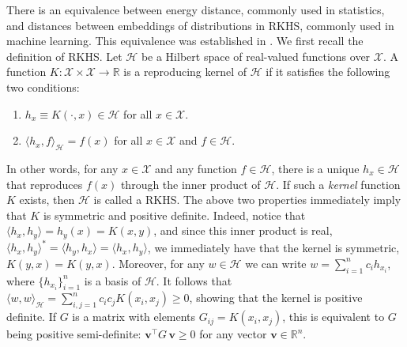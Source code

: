 \documentclass[aps,preprint,nofootinbib,floatfix]{revtex4-1}
\newcommand\kk{K}
\newcommand\kkk{h}
\newcommand\HH{\mathcal{H}}
\begin{document}
There is an equivalence between energy distance, 
commonly used in statistics,
and distances between embeddings of distributions in 
RKHS, commonly used in machine learning. 
This equivalence was established
in \cite{Sejdinovic2013}. We first recall the definition of
RKHS. Let $\HH$ be a Hilbert space of real-valued functions
over $\mathcal{X}$. A function 
$\kk : \mathcal{X} \times \mathcal{X} \to 
\mathbb{R}$ is a reproducing kernel of $\HH$ if it satisfies
the following two conditions:
\begin{enumerate}
\item $\kkk_x \equiv \kk(\cdot, x) \in \HH$ 
for all $x \in \mathcal{X}$.
\item $\langle \kkk_x, f \rangle_{\HH} = f(x)$ for
all $x\in\mathcal{X}$ and $f\in \HH$.
\end{enumerate}
In other words, for any $x \in \mathcal{X}$ and any function $f \in \HH$,
there is a unique 
$\kkk_x \in \HH$ that reproduces $f(x)$ through the inner product
of $\HH$.
If such a \emph{kernel} 
function $\kk$ exists, then $\HH$ is called a RKHS. The above two 
properties immediately imply that $\kk$ is symmetric and positive
definite. Indeed, notice that
$\langle \kkk_x, \kkk_y \rangle = \kkk_y(x) = \kk(x,y)$, and since
this inner product is real,
$\langle \kkk_x, \kkk_y \rangle^* = \langle \kkk_y, \kkk_x \rangle = 
\langle \kkk_x, \kkk_y \rangle$, we immediately have that
the kernel is symmetric,
$\kk(y,x) = \kk(y,x)$. Moreover, for any $w \in
\HH$ we can write $w = \sum_{i=1}^n c_i \kkk_{x_i}$, where
$\{ \kkk_{x_i} \}_{i=1}^n$ is a basis of $\HH$. It follows that
$\langle w, w \rangle_{\HH}  = \sum_{i,j=1}^n c_i c_j \kk(x_i,x_j) \ge 0$,
showing that the kernel is positive definite. If $G$ is a matrix with
elements $G_{ij} = \kk(x_i,x_j)$, this is equivalent to $G$ being
positive semi-definite: $\bm{v}^\top G \, \bm{v} \ge 0$ for any vector
$\bm{v} \in \mathbb{R}^n$.
\end{document}
